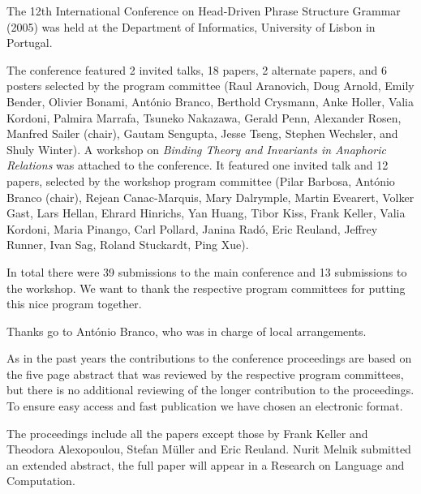 The 12th International Conference on Head-Driven Phrase Structure Grammar (2005) was held at
the Department of Informatics, University of Lisbon in Portugal.

The conference featured 2 invited talks, 18 papers, 2 alternate papers, and 6 posters
selected by the program committee 
(Raul Aranovich,
Doug Arnold,
Emily Bender,
Olivier Bonami,
António Branco,
Berthold Crysmann,
Anke Holler,
Valia Kordoni,
Palmira Marrafa,
Tsuneko Nakazawa,
Gerald Penn,
Alexander Rosen,
Manfred Sailer (chair),
Gautam Sengupta,
Jesse Tseng,
Stephen Wechsler, and
Shuly Winter). 
A workshop on \emph{Binding Theory and Invariants in Anaphoric Relations} was attached to the conference. It featured one invited talk
and 12 papers, selected by the workshop program committee (Pilar Barbosa,
António Branco (chair),
Rejean Canac-Marquis,
Mary Dalrymple,
Martin Evearert,
Volker Gast,
Lars Hellan,
Ehrard Hinrichs,
Yan Huang,
Tibor Kiss,
Frank Keller,
Valia Kordoni,
Maria Pinango,
Carl Pollard,
Janina Radó,
Eric Reuland,
Jeffrey Runner,
Ivan Sag,
Roland Stuckardt,
Ping Xue).

In total there were 39 submissions to the main conference and 13 submissions to the
workshop. 
We want to thank the respective program committees for putting this nice program together.

Thanks go to António Branco, who was in charge of local arrangements.

As in the past years the contributions to the conference proceedings are based on the five page abstract
that was reviewed by the respective program committees, but there is no additional reviewing of the
longer contribution to the proceedings.
To ensure easy access and fast publication we have chosen an electronic format.

The proceedings include all the papers except those by 
Frank Keller and Theodora Alexopoulou, Stefan Müller and Eric Reuland. Nurit Melnik submitted
an extended abstract, the full paper will appear in a Research on Language and Computation.
